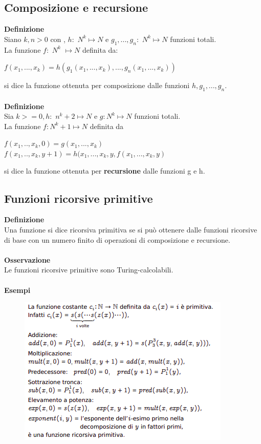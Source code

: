 \subsection{Composizione e recursione}
\textbf{Definizione}\\
Siano $k, n > 0$ con , $h:$ $N^k \mapsto N$ e $g_1,...,g_n:$ $N^k \mapsto N$ funzioni totali.\\
La funzione $f:$ $N^k$ $\mapsto N$ definita da$:$
\begin{center}
    $f(x_1, ... , x_k )= h(g_1(x_1, ... , x_k), ... , g_n(x_1, ... ,x_k))$
\end{center}
si dice la funzione ottenuta per composizione dalle funzioni $h, g_1, ... , g_n$.\\\\
\textbf{Definizione}\\
Sia $k >= 0, h:$ $n^k+2 \mapsto N$ e $g : N^k \mapsto N$ funzioni totali.\\
La funzione $f:N^k+1 \mapsto N$ definita da
\begin{center}
    $f(x_1,..,x_k, 0) = g(x_1,...,x_k)$\\
    $f(x_1,..,x_k, y+1) = h(x_1,...,x_k, y, f(x_1,...,x_k, y)$\\
\end{center}
si dice la funzione ottenuta per \textbf{recursione} dalle funzioni g e h.
\subsection{Funzioni ricorsive primitive}
\textbf{Definizione}\\
Una funzione si dice ricorsiva primitiva se si può ottenere dalle funzioni ricorsive di base con un numero finito di operazioni di composizione e recursione.\\\\
\textbf{Osservazione}\\
Le funzioni ricorsive primitive sono Turing-calcolabili.\\\\
\textbf{Esempi}
\begin{figure}[htp]
    \includegraphics[scale=0.9]{tesi_stile/img/f1cap8.png}
\end{figure}
\newpage
